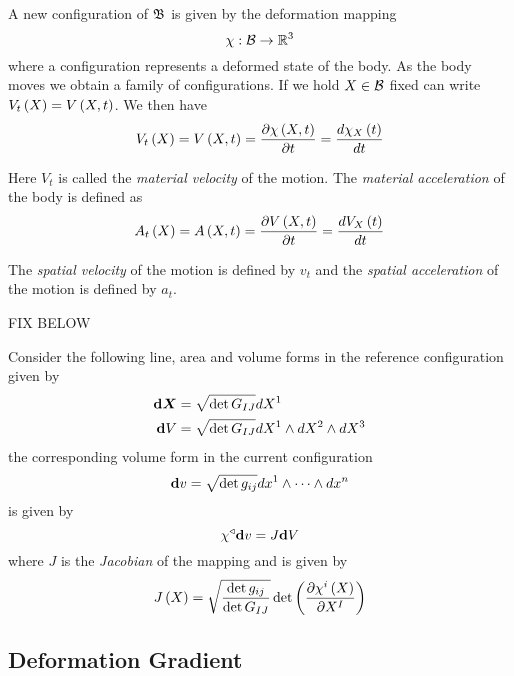 A new configuration of $ \mathfrak{B} $ is given by the deformation mapping
\begin{equation}
  \mapping{\chi}{\embedmanifold{B}}{\rntopology{3}}
\end{equation}
where a configuration represents a deformed state of the body. As the body
moves we obtain a family of configurations. If we hold $X\in \mathcal{B} $
fixed can write $ V_{t}\left( X \right) = V\left( X,t \right) $. We then have
\begin{equation}
   V_{t}\left( X \right) = V\left( X,t \right) = \dfrac{\partial  \chi\left( X,t \right) }{\partial t} = \dfrac{ d  \chi_{X}\left( t \right) }{d t} 
\end{equation}

Here $V_{t}$ is called the \emph{material velocity} of the motion. The
\emph{material acceleration} of the body is defined as
\begin{equation}
   A_{t}\left( X \right) = A\left( X,t \right) = \dfrac{\partial  V\left( X,t \right) }{\partial t} = \dfrac{ d  V_{X}\left( t \right) }{d t} 
\end{equation}

The \emph{spatial velocity} of the motion is defined by $v_{t}$ and the
\emph{spatial acceleration} of the motion is defined by $a_{t}$.

FIX BELOW

Consider the following line, area and volume forms in the reference configuration given by
\begin{align}
    \boldsymbol{\mathrm{d}} \boldsymbol{X} &=\sqrt{\det G_{IJ}}dX^{1} \\
    \boldsymbol{\mathrm{d}}  V &=\sqrt{\det G_{IJ}}  dX^{1} \wedge  dX^{2}  \wedge  dX^{3} 
\end{align}
the corresponding volume form in the current configuration
\begin{equation}
    \boldsymbol{\mathrm{d}}  v =\sqrt{\det g_{ij}}  dx^{1} \wedge \cdots  \wedge  dx^{n} 
\end{equation}
is given by
\begin{equation}
   \chi^{\triangleleft}  \boldsymbol{\mathrm{d}}  v  =J  \boldsymbol{\mathrm{d}}  V 
\end{equation}
where $J$ is the \emph{Jacobian} of the mapping and is given by
\begin{equation}
   J\left( X \right) =\sqrt{\dfrac{\det g_{ij}}{\det G_{IJ}}}\det \left(  \dfrac{\partial  \chi^{i}\left( X \right) }{\partial X^{I}}  \right)
\end{equation}

\subsection{Deformation Gradient}

